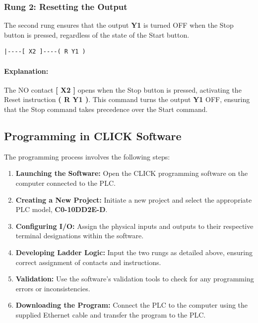 \documentclass[12pt]{article}
\begin{document}
\subsubsection{Rung 2: Resetting the Output}

The second rung ensures that the output \textbf{Y1} is turned OFF when the Stop button is pressed, regardless of the state of the Start button.

\begin{lstlisting}[language={}, frame=single]
|----[ X2 ]----( R Y1 )
\end{lstlisting}

\paragraph{Explanation:} 
The NO contact \textbf{[ X2 ]} opens when the Stop button is pressed, activating the Reset instruction \textbf{( R Y1 )}. This command turns the output \textbf{Y1} OFF, ensuring that the Stop command takes precedence over the Start command.

\subsection{Programming in CLICK Software}

The programming process involves the following steps:

\begin{enumerate}
    \item \textbf{Launching the Software:} Open the CLICK programming software on the computer connected to the PLC.
    \item \textbf{Creating a New Project:} Initiate a new project and select the appropriate PLC model, \textbf{C0-10DD2E-D}.
    \item \textbf{Configuring I/O:} Assign the physical inputs and outputs to their respective terminal designations within the software.
    \item \textbf{Developing Ladder Logic:} Input the two rungs as detailed above, ensuring correct assignment of contacts and instructions.
    \item \textbf{Validation:} Use the software's validation tools to check for any programming errors or inconsistencies.
    \item \textbf{Downloading the Program:} Connect the PLC to the computer using the supplied Ethernet cable and transfer the program to the PLC.
\end{enumerate}
\end{document}
